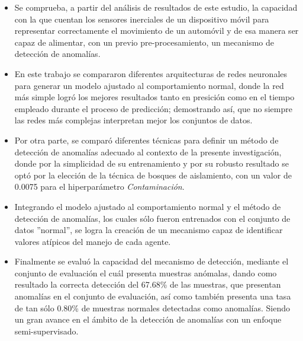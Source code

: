 \begin{itemize}
\item Se comprueba, a partir del an\'{a}lisis de resultados de este estudio, la capacidad con la que cuentan los sensores inerciales de un dispositivo m\'{o}vil para representar correctamente el movimiento de un autom\'{o}vil y de esa manera ser capaz de alimentar, con un previo pre-procesamiento, un mecanismo de detecci\'{o}n de anomal\'{i}as.
\item En este trabajo se compararon diferentes arquitecturas de redes neuronales para generar un modelo ajustado al comportamiento normal, donde la red m\'{a}s simple logr\'{o} los mejores resultados tanto en presici\'{o}n como en el tiempo empleado durante el proceso de predicci\'{o}n; demostrando as\'{i}, que no siempre las redes m\'{a}s complejas interpretan mejor los conjuntos de datos.
\item Por otra parte, se compar\'{o} diferentes t\'{e}cnicas para definir un m\'{e}todo de detecci\'{o}n de anomal\'{i}as adecuado al contexto de la presente investigaci\'{o}n, donde por la simplicidad de su entrenamiento y por su robusto resultado se opt\'{o} por la elecci\'{o}n de la t\'{e}cnica de bosques de aislamiento, con un valor de 0.0075 para el hiperpar\'{a}metro \textit{Contaminaci\'{o}n}.
\item Integrando el modelo ajustado al comportamiento normal y el m\'{e}todo de detecci\'{o}n de anomal\'{i}as, los cuales s\'{o}lo fueron entrenados con el conjunto de datos ''normal'', se logra la creaci\'{o}n de un mecanismo capaz de identificar valores at\'{i}picos del manejo de cada agente.
\item Finalmente se evalu\'{o} la capacidad del mecanismo de detecci\'{o}n, mediante el conjunto de evaluaci\'{o}n el cu\'{a}l presenta muestras an\'{o}malas, dando como resultado la correcta detecci\'{o}n del 67.68\% de las muestras, que presentan anomal\'{i}as en el conjunto de evaluaci\'{o}n, as\'{i} como tambi\'{e}n presenta una tasa de tan s\'{o}lo 0.80\% de muestras normales detectadas como anomal\'{i}as. Siendo un gran avance en el \'{a}mbito de la detecci\'{o}n de anomal\'{i}as con un enfoque semi-supervisado.%
\end{itemize}

